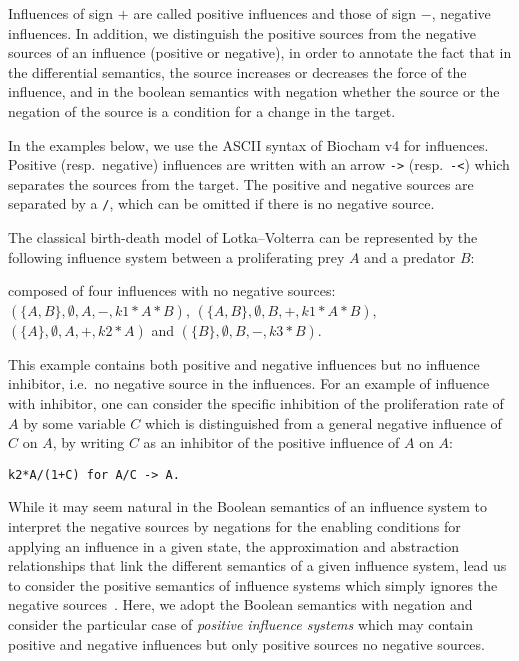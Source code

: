 \documentclass{llncs}
\begin{document}
Influences of sign $+$ are called {positive influences} and those of
sign $-$, {negative influences}.
In addition, we distinguish the positive sources from the negative sources of an influence (positive or negative),
in order to annotate the fact that in the differential semantics,
the source increases or decreases the force of the influence,
and in the boolean semantics with negation whether the source or the negation of the source
is a condition for a change in the target.

In the examples below, we use the ASCII syntax of Biocham v4 for influences.
Positive (resp.~negative) influences are written with an arrow \lstinline|->| (resp.~\lstinline+-<+)
which separates the sources from the target.
The positive and negative sources are separated
by a \lstinline|/|, which can be omitted if there is no negative source.

\begin{example}\label{ex:LVi}
   The classical birth-death model of Lotka--Volterra can be represented by the following
influence system between a proliferating prey $A$ and a predator $B$:
  
   composed of four influences with no negative sources:
   $(\{A, B\}, \emptyset, A, -, k1*A*B)$, $(\{A, B\}, \emptyset, B, +, k1*A*B)$, $(\{A\}, \emptyset, A, +, k2*A)$ and $(\{B\}, \emptyset, B, -, k3*B)$.

This example contains both positive and negative influences but no influence inhibitor, i.e.~no negative source in the influences.
For an example of influence with inhibitor, one can consider the specific inhibition of the proliferation rate of $A$ by some variable $C$
which is distinguished from a general negative influence of $C$ on $A$, by writing $C$ as an inhibitor of the positive influence of $A$ on $A$:
   \begin{lstlisting}
k2*A/(1+C) for A/C -> A.
   \end{lstlisting}
\end{example}

While it may seem natural in the Boolean semantics of an influence system to interpret the negative sources by negations
for the enabling conditions for applying an influence in a given state, 
the approximation and abstraction relationships that link the different semantics of a given influence system,
lead us to consider the positive semantics of influence systems which simply ignores the negative sources~\cite{FMRS16cmsb}.
Here, we adopt the Boolean semantics with negation and consider the particular case of \emph{positive influence systems}
which may contain positive and negative influences but only positive sources no negative sources.
\end{document}
